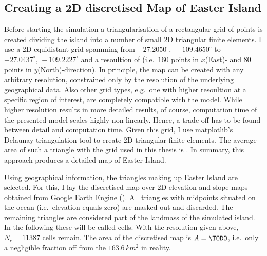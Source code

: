 \subsection{Creating a 2D discretised Map of Easter Island}

Before starting the simulation a triangularisation of a rectangular grid of points is created dividing the island into a number of small 2D triangular finite elements.
I use a 2D equidistant grid spannning from $-27.2050^\circ, \, -109.4650^\circ$ to $-27.0437^\circ, \, -109.2227^\circ$ and a resoultion of (i.e.\ $160$ points in $x$(East)- and $80$ points in $y$(North)-direction). 
In principle, the map can be created with any arbitrary resolution, constrained only by the resolution of the underlying geographical data. 
Also other grid types, e.g.\ one with higher resoultion at a specific region of interest, are completely compatible with the model. 
While higher resolution results in more detailed results, of course, computation time of the presented model scales highly non-linearly.
Hence, a trade-off has to be found between detail and computation time.
Given this grid, I use matplotlib's Delaunay triangulation tool to create 2D triangular finite elements.
The average area of such a triangle with the grid used in this thesis is \TODO.  
In summary, this approach produces a detailed map of Easter Island.

Using geographical information, the triangles making up Easter Island are selected.
For this, I lay the discretised map over 2D elevation and slope maps obtained from Google Earth Engine (\TODO).
All triangles with midpoints situated on the ocean (i.e.\ elevation equals zero) are masked out and discarded.
The remaining triangles are considered part of the landmass of the simulated island. 
In the following these will be called cells.
With the resolution given above, $N_c = 11387$ cells remain. The area of the discretised map is $A=\TODO$, i.e.\ only a negligible fraction off from the $163.6\, {km^2}$ in reality.

